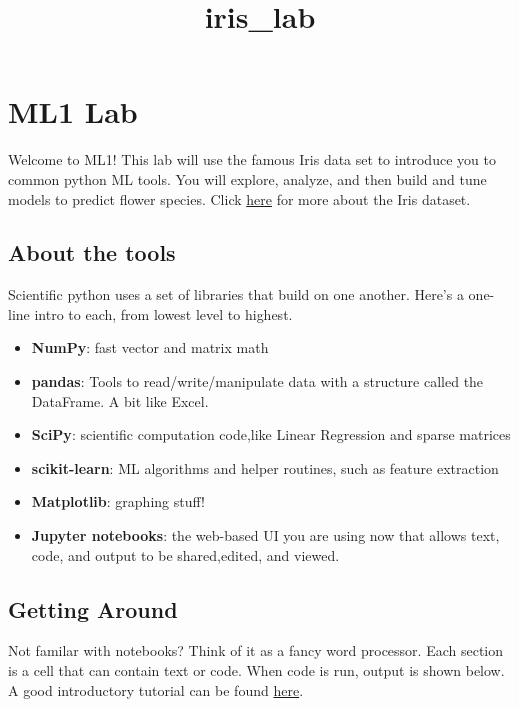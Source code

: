 \documentclass[8pt]{extarticle}
\title{iris\_lab}
\providecommand{\tightlist}{%
      \setlength{\itemsep}{0pt}\setlength{\parskip}{0pt}}
\begin{document}
    
    
    \maketitle
    
    

    
    \section{ML1 Lab}\label{ml1-lab}

    Welcome to ML1! This lab will use the famous Iris data set to introduce
you to common python ML tools. You will explore, analyze, and then build
and tune models to predict flower species. Click
\href{https://en.wikipedia.org/wiki/Iris_flower_data_set}{here} for more
about the Iris dataset.

    \subsection{About the tools}\label{about-the-tools}

    Scientific python uses a set of libraries that build on one another.
Here's a one-line intro to each, from lowest level to highest.

\begin{itemize}
\tightlist
\item
  \textbf{NumPy}: fast vector and matrix math
\item
  \textbf{pandas}: Tools to read/write/manipulate data with a structure
  called the DataFrame. A bit like Excel.
\item
  \textbf{SciPy}: scientific computation code,like Linear Regression and
  sparse matrices
\item
  \textbf{scikit-learn}: ML algorithms and helper routines, such as
  feature extraction
\item
  \textbf{Matplotlib}: graphing stuff!
\item
  \textbf{Jupyter notebooks}: the web-based UI you are using now that
  allows text, code, and output to be shared,edited, and viewed.
\end{itemize}

    \subsection{Getting Around}\label{getting-around}

    Not familar with notebooks? Think of it as a fancy word processor. Each
section is a cell that can contain text or code. When code is run,
output is shown below. A good introductory tutorial can be found
\href{https://www.dataquest.io/blog/jupyter-notebook-tutorial}{here}.
\end{document}
